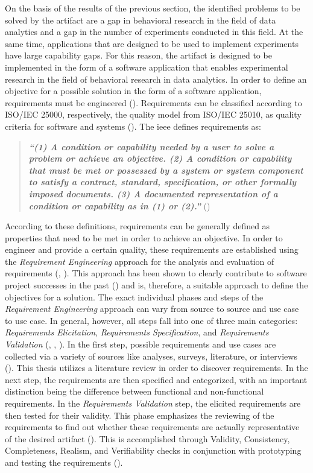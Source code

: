 On the basis of the results of the previous section, the identified problems to be solved by the artifact are a gap in behavioral research in the field of data analytics and a gap in the number of experiments conducted in this field. At the same time, applications that are designed to be used to implement experiments have large capability gaps. For this reason, the artifact is designed to be implemented in the form of a software application that enables experimental research in the field of behavioral research in data analytics. In order to define an objective for a possible solution in the form of a software application, requirements must be engineered (\cite{Seacord.2003}). Requirements can be classified according to ISO/IEC 25000, respectively, the quality model from ISO/IEC 25010, as quality criteria for software and systems (\cite{ISOIEC25010.2011}). The \ac{ieee} defines requirements as:
\begin{quote}
    \textbf{\textit{\enquote{(1) A condition or capability needed by a user to solve a problem or achieve an objective. (2) A condition or capability that must be met or possessed by a system or system component to satisfy a contract, standard, specification, or other formally imposed documents. (3) A documented representation of a condition or capability as in (1) or (2).}}} (\cite{IEEE.1990})
\end{quote}  
According to these definitions, requirements can be generally defined as properties that need to be met in order to achieve an objective. In order to engineer and provide a certain quality, these requirements are established using the \textit{Requirement Engineering} approach for the analysis and evaluation of requirements (\cite{SWEBOK.2004}, \cite{Sommerville.2011}). This approach has been shown to clearly contribute to software project successes in the past (\cite{Hofmann.2001}) and is, therefore, a suitable approach to define the objectives for a solution. The exact individual phases and steps of the \textit{Requirement Engineering} approach can vary from source to source and use case to use case. In general, however, all steps fall into one of three main categories: \textit{Requirements Elicitation}, \textit{Requirements Specification}, and \textit{Requirements Validation} (\cite{SWEBOK.2004}, \cite{Sommerville.2011}, \cite{Fernandes.2009}). In the first step, possible requirements and use cases are collected via a variety of sources like analyses, surveys, literature, or interviews (\cite{Sommerville.2011}). This thesis utilizes a literature review in order to discover requirements. In the next step, the requirements are then specified and categorized, with an important distinction being the difference between functional and non-functional requirements. In the \textit{Requirements Validation} step, the elicited requirements are then tested for their validity. This phase emphasizes the reviewing of the requirements to find out whether these requirements are actually representative of the desired artifact (\cite{Sommerville.2011}). This is accomplished through Validity, Consistency, Completeness, Realism, and Verifiability checks in conjunction with prototyping and testing the requirements (\cite{Sommerville.2011}).

